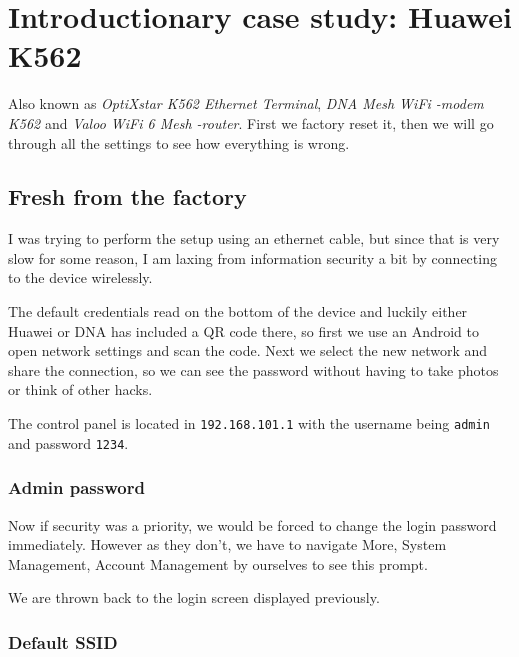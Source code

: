 \documentclass[../wifi-security.tex]{subfiles}
\begin{document}
\section{Introductionary case study: Huawei K562}

Also known as \textit{OptiXstar K562 Ethernet Terminal}, \textit{DNA Mesh WiFi -modem K562} and \textit{Valoo WiFi 6 Mesh -router}. First we factory reset it, then we will go through all the settings to see how everything is wrong.

\subsection{Fresh from the factory}

I was trying to perform the setup using an ethernet cable, but since that is very slow for some reason, I am laxing from information security a bit by connecting to the device wirelessly.


The default credentials read on the bottom of the device and luckily either Huawei or DNA has included a QR code there, so first we use an Android to open network settings and scan the code. Next we select the new network and share the connection, so we can see the password without having to take photos or think of other hacks.

The control panel is located in \texttt{192.168.101.1} with the username being \texttt{admin} and password \texttt{1234}.


\subsubsection{Admin password}

Now if security was a priority, we would be forced to change the login password immediately. However as they don't, we have to navigate More, System Management, Account Management by ourselves to see this prompt.


We are thrown back to the login screen displayed previously.


\subsubsection{Default SSID}
\end{document}

